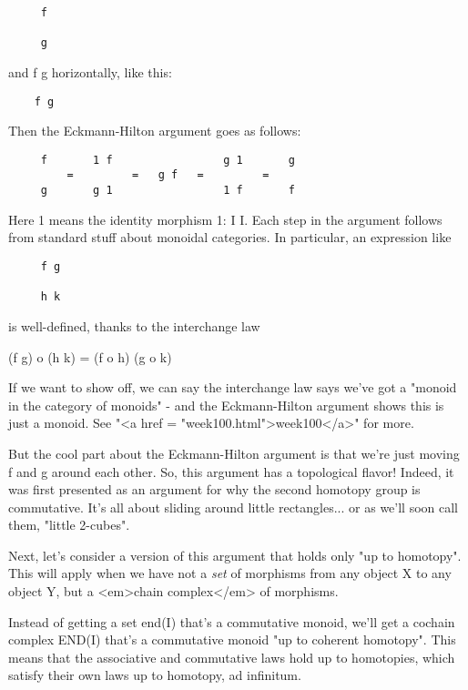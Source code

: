 \begin{verbatim}
     f

     g
\end{verbatim}
    

and f \otimes  g horizontally, like this:

\begin{verbatim}
    f g
\end{verbatim}
    

Then the Eckmann-Hilton argument goes as follows:

\begin{verbatim}
     f       1 f                 g 1       g
         =         =   g f   =         = 
     g       g 1                 1 f       f
\end{verbatim}
    
Here 1 means the identity morphism 1: I \to  I.  Each step in the 
argument follows from standard stuff about monoidal categories.  
In particular, an expression like

\begin{verbatim}
     f g

     h k
\end{verbatim}
    

is well-defined, thanks to the interchange law

(f \otimes  g) o (h \otimes  k) = (f o h) \otimes  (g o k)

If we want to show off, we can say the interchange law says we've got
a "monoid in the category of monoids" - and the Eckmann-Hilton
argument shows this is just a monoid.  See "<a href =
"week100.html">week100</a>" for more.

But the cool part about the Eckmann-Hilton argument is that we're 
just moving f and g around each other.  So, this argument has a 
topological flavor!  Indeed, it was first presented as an argument
for why the second homotopy group is commutative.  It's all about 
sliding around little rectangles... or as we'll soon call 
them, "little 2-cubes".  

Next, let's consider a version of this argument that holds only
"up to homotopy".  This will apply when we have not a \emph{set}
of morphisms from any object X to any object Y, but a <em>chain 
complex</em> of morphisms.  

Instead of getting a set end(I) that's a commutative monoid, we'll 
get a cochain complex END(I) that's a commutative monoid "up to 
coherent homotopy".  This means that the associative and
commutative laws hold up to homotopies, which satisfy their
own laws up to homotopy, ad infinitum.

